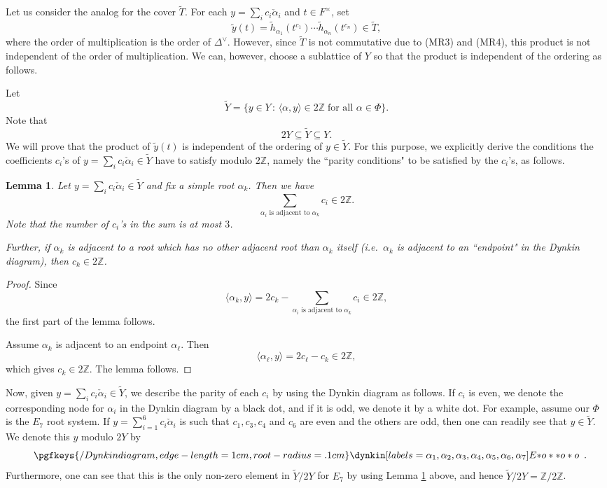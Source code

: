 \documentclass[10pt, letterpaper]{amsart}
\theoremstyle{plain}
\newtheorem{Lem}[equation]{Lemma}
\theoremstyle{definition}
\numberwithin{equation}{section}
\newcommand{\Z}{\mathbb{Z}}
\newcommand{\yt}{\tilde{y}}
\newcommand{\htt}{\tilde{h}}
\newcommand{\alphac}{{\check{\alpha}}}
\newcommand{\Tt}{\widetilde{T}}
\newcommand{\Yt}{\widetilde{Y}}
\newcommand{\la}{\langle}
\newcommand{\ra}{\rangle}
\newcommand{\ie}{{\it i.e.}\ }
\newcommand{\st}{\,:\,}
\begin{document}
Let us consider the analog for the cover $\Tt$. For each $y=\sum_{i}c_i\alphac_i$ and $t\in F^\times$, set
\[
\yt(t)=\htt_{\alpha_1}(t^{c_1})\cdots \htt_{\alpha_n}(t^{c_n})\in \Tt,
\]
where the order of multiplication is the order of $\Delta^\vee$. However, since $\Tt$ is not commutative due to (MR3) and (MR4), this product is not independent of the order of multiplication. We can, however, choose a sublattice of $Y$ so that the product is independent of the ordering as follows.

Let
\begin{equation}\label{E:definition_of_Yt}
\Yt=\{y\in Y\st \la \alpha, y\ra\in 2\Z\;\text{for all $\alpha \in \Phi$}\}.
\end{equation}
Note that
\[
2Y\subseteq \Yt\subseteq Y.
\]
We will prove that the product of $\yt(t)$ is independent of the ordering of $y\in\Yt$. For this purpose, we explicitly derive the conditions the coefficients $c_i$'s of $y=\sum_ic_i\alphac_i\in \Yt$ have to satisfy modulo $2\Z$, namely the ``parity conditions" to be satisfied by the $c_i$'s, as follows.

\begin{Lem}\label{L:parity_of_adjacent_root}
Let $y=\sum_ic_i\alphac_i\in \Yt$ and fix a simple root $\alpha_k$. Then we have
\[
\sum_{\text{$\alpha_i$ is adjacent to $\alpha_k$}}c_i\in 2\Z.
\]
Note that the number of $c_i$'s in the sum is at most $3$. 

Further, if $\alpha_k$ is adjacent to a root which has no other adjacent root than $\alpha_k$ itself (\ie $\alpha_k$ is adjacent to an ``endpoint" in the Dynkin diagram), then $c_k\in 2\Z$.
\end{Lem}
\begin{proof}
Since 
\[
\la \alpha_k,  y\ra=2c_k-\sum_{\text{$\alpha_i$ is adjacent to $\alpha_k$}}c_i\in 2\Z,
\]
the first part of the lemma follows.

Assume $\alpha_k$ is adjacent to an endpoint $\alpha_\ell$. Then
\[
\la \alpha_\ell, y\ra=2c_\ell-c_k\in 2\Z,
\]
which gives $c_k\in 2\Z$. The lemma follows.
\end{proof}


Now, given $y=\sum_ic_i\alphac_i\in \Yt$, we describe the parity of each $c_i$ by using the Dynkin diagram as follows. If $c_i$ is even, we denote the corresponding node for $\alpha_i$ in the Dynkin diagram by a black dot, and if it is odd, we denote it by a white dot. For example, assume our $\Phi$ is the $E_7$ root system. If $y=\sum_{i=1}^6c_i\alphac_i$ is such that $c_1, c_3, c_4$ and $c_6$ are even and the others are odd, then one can readily see that $y\in\Yt$. We denote this $y$ modulo $2Y$ by 
\[
\pgfkeys{/Dynkin diagram, edge-length=1cm, root-radius=.1cm}
\dynkin[labels={\alpha_1,\alpha_2,\alpha_3,\alpha_4,\alpha_5,\alpha_6,\alpha_7}]  E{*o**o*o}\rlap{\, .}
\]
Furthermore, one can see that this is the only non-zero element in $\Yt\slash 2Y$ for $E_7$ by using Lemma \ref{L:parity_of_adjacent_root} above, and hence $\Yt\slash 2Y=\Z\slash 2\Z$. 
\end{document}
